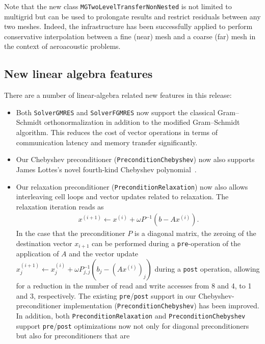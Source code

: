 \documentclass{ansarticle-preprint}
\begin{document}
Note that the new class \texttt{MGTwoLevelTransferNonNested} is not limited to
multigrid but can be used to prolongate results and restrict residuals between any
two meshes. Indeed, the infrastructure has been successfully applied to perform
conservative interpolation between a fine (near) mesh and a coarse (far) mesh in the
context of aeroacoustic problems.


\subsection{New linear algebra features}\label{sec:lac}

There are a number of linear-algebra related new features in this release:
\begin{itemize}
  \item Both \texttt{SolverGMRES} and \texttt{SolverFGMRES} now support the classical
  Gram--Schmidt orthonormalization in addition to the modified Gram--Schmidt algorithm. This
  reduces the cost of vector operations in terms of
  communication latency and memory transfer significantly.
  \item Our Chebyshev preconditioner (\texttt{PreconditionChebyshev}) now also
  supports James Lottes’s novel fourth-kind Chebyshev
  polynomial~\cite{lottes2022optimal, phillips2022optimal}.
  \item Our relaxation preconditioner (\texttt{PreconditionRelaxation}) now also
  allows interleaving cell loops and vector updates related to relaxation. The
  relaxation iteration reads as
  \begin{align*}
  x^{(i+1)} \gets x^{(i)} + \omega P^{-1}(b-Ax^{(i)}).
  \end{align*}
  In the case that the preconditioner $P$ is a diagonal matrix, the zeroing of
  the destination vector $x_{i+1}$ can be performed during a
  \texttt{pre}-operation  of the application of $A$
  and the vector update $x^{(i+1)}_j \gets x^{(i)}_j + \omega P^{-1}_{j,j}(b_j-(Ax^{(i)})_j)$
  during a \texttt{post} operation, allowing for a reduction in the number of read and write
  accesses from 8 and 4, to 1 and 3, respectively. The existing \texttt{pre}/\texttt{post}
  support in our Chebyshev-preconditioner implementation (\texttt{PreconditionChebyshev})
  has been improved. In addition, both \texttt{PreconditionRelaxation} and 
  \texttt{PreconditionChebyshev} support \texttt{pre}/\texttt{post} optimizations
  now not only for diagonal preconditioners but also for preconditioners that are

\end{itemize}
\end{document}
